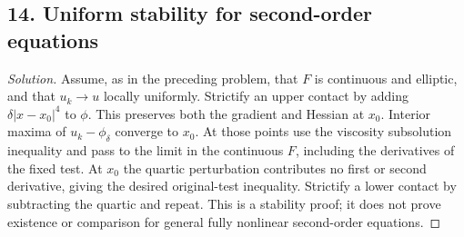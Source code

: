 \subsection*{14. Uniform stability for second-order equations}
\begin{proof}[Solution]
Assume, as in the preceding problem, that $F$ is continuous and elliptic,
and that $u_k\to u$ locally uniformly. Strictify an upper contact by
adding $\delta|x-x_0|^4$ to $\phi$. This preserves both the gradient
and Hessian at $x_0$. Interior maxima of $u_k-\phi_\delta$ converge
to $x_0$. At those points use the viscosity subsolution inequality and
pass to the limit in the continuous $F$, including the derivatives of
the fixed test. At $x_0$ the quartic perturbation contributes no first
or second derivative, giving the desired original-test inequality.
Strictify a lower contact by subtracting the quartic and repeat.
This is a stability proof; it does not prove existence or comparison
for general fully nonlinear second-order equations.
\end{proof}
